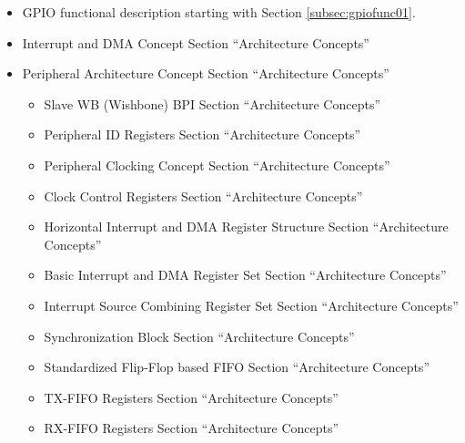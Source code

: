 \begin{itemize}
  \item GPIO functional description starting with Section \ref{subsec:gpiofunc01}.
  \item Interrupt and DMA Concept Section ``Architecture Concepts''
  \item Peripheral Architecture Concept Section ``Architecture Concepts''
  \begin{itemize}
    \item Slave WB (Wishbone) BPI Section ``Architecture Concepts''
    \item Peripheral ID Registers Section ``Architecture Concepts''
    \item Peripheral Clocking Concept Section ``Architecture Concepts''
    \item Clock Control Registers Section ``Architecture Concepts''
    \item Horizontal Interrupt and DMA Register Structure Section ``Architecture Concepts''
    \item Basic Interrupt and DMA Register Set Section ``Architecture Concepts''
    \item Interrupt Source Combining Register Set Section ``Architecture Concepts''
    \item Synchronization Block Section ``Architecture Concepts''
    \item Standardized Flip-Flop based FIFO Section ``Architecture Concepts''
    \item TX-FIFO Registers Section ``Architecture Concepts''
    \item RX-FIFO Registers Section ``Architecture Concepts''
  \end{itemize}
\end{itemize}
